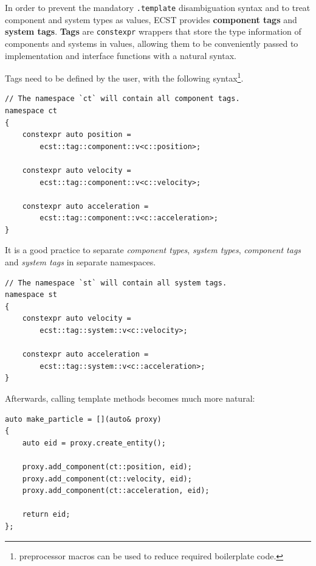 \documentclass[oneside, 12pt, a4paper, openany]{book}
\begin{document}
In order to prevent the mandatory
\texttt{.template}
disambiguation syntax and to treat component and system types as values,
ECST provides \textbf{component tags} and \textbf{system tags}.
\textbf{Tags} are
\texttt{constexpr}
wrappers that store the type information of components and systems in
values, allowing them to be conveniently passed to implementation and
interface functions with a natural syntax.

Tags need to be defined by the user, with the following syntax\footnote{preprocessor
  macros can be used to reduce required boilerplate code.}.

\begin{verbatim}
// The namespace `ct` will contain all component tags.
namespace ct
{
    constexpr auto position =
        ecst::tag::component::v<c::position>;

    constexpr auto velocity =
        ecst::tag::component::v<c::velocity>;

    constexpr auto acceleration =
        ecst::tag::component::v<c::acceleration>;
}
\end{verbatim}

It is a good practice to separate \emph{component types}, \emph{system
types}, \emph{component tags} and \emph{system tags} in separate
namespaces.

\begin{verbatim}
// The namespace `st` will contain all system tags.
namespace st
{
    constexpr auto velocity =
        ecst::tag::system::v<c::velocity>;

    constexpr auto acceleration =
        ecst::tag::system::v<c::acceleration>;
}
\end{verbatim}

Afterwards, calling template methods becomes much more natural:

\begin{verbatim}
auto make_particle = [](auto& proxy)
{
    auto eid = proxy.create_entity();

    proxy.add_component(ct::position, eid);
    proxy.add_component(ct::velocity, eid);
    proxy.add_component(ct::acceleration, eid);

    return eid;
};
\end{verbatim}
\end{document}
